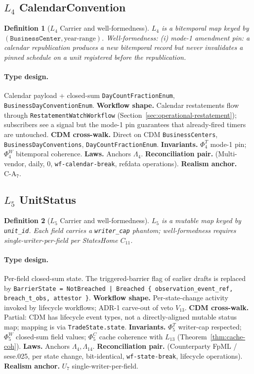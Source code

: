 \documentclass[11pt,a4paper]{article}
\newtheorem{definition}{Definition}[section]
\begin{document}
\subsection{$L_4$ CalendarConvention}
\label{sec:leaf-l4}

\begin{definition}[$L_4$ Carrier and well-formedness]
$L_4$ is a bitemporal map keyed by $(\texttt{BusinessCenter}, \text{year-range})$. Well-formedness: (i) mode-1 amendment pin: a calendar republication produces a new bitemporal record but \emph{never} invalidates a pinned schedule on a unit registered before the republication.
\end{definition}

\paragraph{Type design.} Calendar payload + closed-sum \texttt{DayCountFractionEnum}, \texttt{BusinessDayConventionEnum}. \textbf{Workflow shape.} Calendar restatements flow through \texttt{RestatementWatchWorkflow} (Section~\ref{sec:operational-restatement}); subscribers see a signal but the mode-1 pin guarantees that already-fired timers are untouched. \textbf{CDM cross-walk.} Direct on CDM \texttt{BusinessCenters}, \texttt{BusinessDayConventions}, \texttt{DayCountFractionEnum}. \textbf{Invariants.} $\Phi_4^T$ mode-1 pin; $\Phi_4^W$ bitemporal coherence. \textbf{Laws.} Anchors $\Lambda_4$. \textbf{Reconciliation pair.} (Multi-vendor, daily, 0, \texttt{wf-calendar-break}, refdata operations). \textbf{Realism anchor.} $\mathrm{C\textrm{-}A}_7$.

\subsection{$L_5$ UnitStatus}
\label{sec:leaf-l5}

\begin{definition}[$L_5$ Carrier and well-formedness]
$L_5$ is a mutable map keyed by \texttt{unit\_id}. Each field carries a \texttt{writer\_cap} phantom; well-formedness requires single-writer-per-field per StatesHome $C_{11}$.
\end{definition}

\paragraph{Type design.} Per-field closed-sum state. The triggered-barrier flag of earlier drafts is replaced by \texttt{BarrierState = NotBreached | Breached \{ observation\_event\_ref, breach\_t\_obs, attestor \}}. \textbf{Workflow shape.} Per-state-change activity invoked by lifecycle workflows; ADR-1 carve-out of veto $V_{13}$. \textbf{CDM cross-walk.} Partial: CDM has lifecycle event types, not a directly-aligned mutable status map; mapping is via \texttt{TradeState.state}. \textbf{Invariants.} $\Phi_5^T$ writer-cap respected; $\Phi_5^W$ closed-sum field values; $\Phi_5^C$ cache coherence with $L_{13}$ (Theorem~\ref{thm:cache-coh}). \textbf{Laws.} Anchors $\Lambda_4, \Lambda_{14}$. \textbf{Reconciliation pair.} (Counterparty FpML / sese.025, per state change, bit-identical, \texttt{wf-state-break}, lifecycle operations). \textbf{Realism anchor.} $U_7$ single-writer-per-field.
\end{document}
